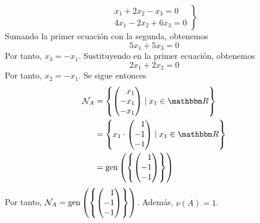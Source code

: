 \begin{example}
    $$\left. \begin{array}{r}
        x_1 + 2x_2 - x_3 = 0\\
        4x_1 - 2x_2 + 6x_3 = 0
    \end{array} \right\}$$
    Sumando la primer ecuación con la segunda, obtenemos
    $$5x_1 + 5x_3 = 0$$
    Por tanto, $x_3 = -x_1$. Sustituyendo en la primer ecuación, obtenemos
    $$2x_1 + 2x_2 = 0$$
    Por tanto, $x_2 = -x_1$. Se sigue entonces
    \begin{align*}
        \mathcal{N}_A & = \left\{ \begin{pmatrix*}[r]
            x_1 \\
            -x_1 \\
            -x_1
        \end{pmatrix*} \mid x_1 \in \RR \right\} \\
        & = \left\{ x_1 \cdot \begin{pmatrix*}[r]
            1 \\
            -1 \\
            -1
        \end{pmatrix*} \mid x_1 \in \RR \right\} \\
        & = \Gen \left( \left\{ \begin{pmatrix*}[r]
            1 \\
            -1 \\
            -1
        \end{pmatrix*} \right\} \right)
    \end{align*}
    Por tanto, $\mathcal{N}_A = \Gen \left( \left\{ \begin{pmatrix*}[r]
        1 \\
        -1 \\
        -1
    \end{pmatrix*} \right\} \right)$.  Además, $\nu(A) = 1$.
\end{example}

